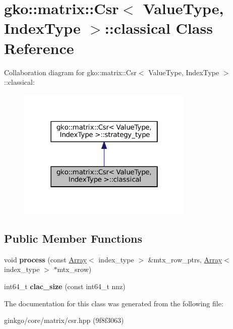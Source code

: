 \hypertarget{classgko_1_1matrix_1_1Csr_1_1classical}{}\section{gko\+:\+:matrix\+:\+:Csr$<$ Value\+Type, Index\+Type $>$\+:\+:classical Class Reference}
\label{classgko_1_1matrix_1_1Csr_1_1classical}


Collaboration diagram for gko\+:\+:matrix\+:\+:Csr$<$ Value\+Type, Index\+Type $>$\+:\+:classical\+:
\nopagebreak
\begin{figure}[H]
\begin{center}
\leavevmode
\includegraphics[width=238pt]{classgko_1_1matrix_1_1Csr_1_1classical__coll__graph}
\end{center}
\end{figure}
\subsection*{Public Member Functions}
\begin{DoxyCompactItemize}
\item 
\mbox{\label{classgko_1_1matrix_1_1Csr_1_1classical_a3d2766e56763c491948818e0f3da4356}} 
void {\bfseries process} (const \hyperlink{classgko_1_1Array}{Array}$<$ index\+\_\+type $>$ \&mtx\+\_\+row\+\_\+ptrs, \hyperlink{classgko_1_1Array}{Array}$<$ index\+\_\+type $>$ $\ast$mtx\+\_\+srow)
\item 
\mbox{\label{classgko_1_1matrix_1_1Csr_1_1classical_a790b475b079d3d97de776e968f459f41}} 
int64\+\_\+t {\bfseries clac\+\_\+size} (const int64\+\_\+t nnz)
\end{DoxyCompactItemize}


The documentation for this class was generated from the following file\+:\begin{DoxyCompactItemize}
\item 
ginkgo/core/matrix/csr.\+hpp (9f8f3063)\end{DoxyCompactItemize}
